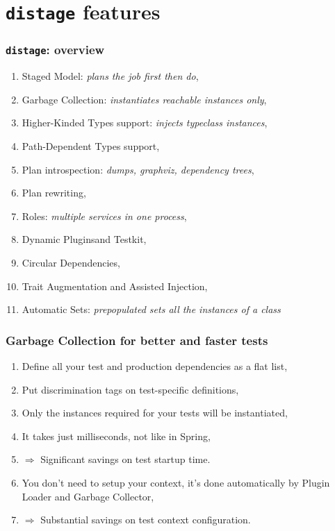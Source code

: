 \documentclass[usenames,dvipsnames]{beamer}
\newcommand{\distage}{\texttt{distage}\xspace}
\begin{document}
\section{\distage{} features}
\begin{frame}
  \frametitle{\distage: overview}
  \begin{enumerate}
    \item Staged Model: \textit{plans the job first then do},
    \item Garbage Collection: \textit{instantiates reachable instances only},
    \item Higher-Kinded Types support: \textit{injects typeclass instances},
    \item Path-Dependent Types support,
    \item Plan introspection: \textit{dumps, graphviz, dependency trees},
    \item Plan rewriting,
    \item Roles: \textit{multiple services in one process},
    \item Dynamic Plugins\footnotemark[2] and Testkit,
    \item Circular Dependencies\footnotemark[1],
    \item Trait Augmentation and Assisted Injection\footnotemark[1],
    \item Automatic Sets: \textit{prepopulated sets all the instances of a class}
  \end{enumerate}
\end{frame}

\begin{frame}
\frametitle{Garbage Collection for better and faster tests}
  \begin{enumerate}
    \item Define all your test and production dependencies as a flat list,
    \item Put discrimination tags on test-specific definitions,
    \item Only the instances required for your tests will be instantiated,
    \item It takes just milliseconds, not like in Spring,
    \item $\Rightarrow$ Significant savings on test startup time.
    \item You don't need to setup your context, it's done automatically by Plugin Loader and Garbage Collector,
    \item $\Rightarrow$ Substantial savings on test context configuration.
  \end{enumerate}
\end{frame}
\end{document}
